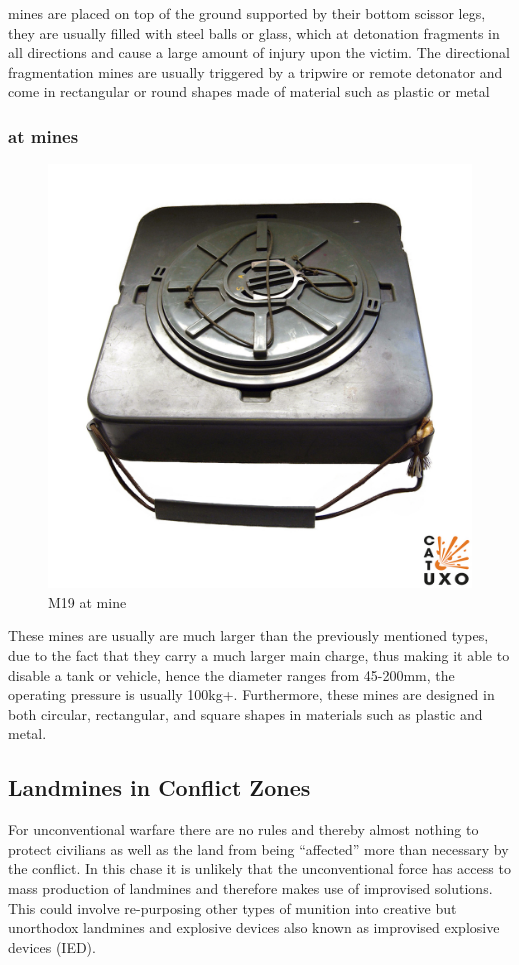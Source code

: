 mines are placed on top of the ground supported by their bottom scissor legs, they are usually filled with steel balls or glass, which at detonation fragments in all directions and cause a large amount of injury upon the victim. The directional fragmentation mines are usually triggered by a tripwire or remote detonator and come in rectangular or round shapes made of material such as plastic or metal \cite{mine_detection}


\subsubsection*{\gls{at} mines} 

\begin{figure}
\vspace{-8mm}
\centering
\includegraphics[width=0.5\linewidth]{tex/00 - Images/m19i-003a.jpg}
  \caption{M19 \gls{at} mine \cite{m19}}
  \label{fig:m19}
\end{figure}

These mines are usually are much larger than the previously mentioned types, due to the fact that they carry a much larger main charge, thus making it able to disable a tank or vehicle, hence the diameter ranges from 45-200mm, the operating pressure is usually 100kg+. Furthermore, these mines are designed in both circular, rectangular, and square shapes in materials such as plastic and metal. \cite{mine_detection}

\subsection{Landmines in Conflict Zones}

For unconventional warfare there are no rules and thereby almost nothing to protect civilians as well as the land from being “affected” more than necessary by the conflict. In this chase it is unlikely that the unconventional force has access to mass production of landmines and therefore makes use of improvised solutions. This could involve re-purposing other types of munition into creative but unorthodox landmines and explosive devices also known as improvised explosive devices (IED).

